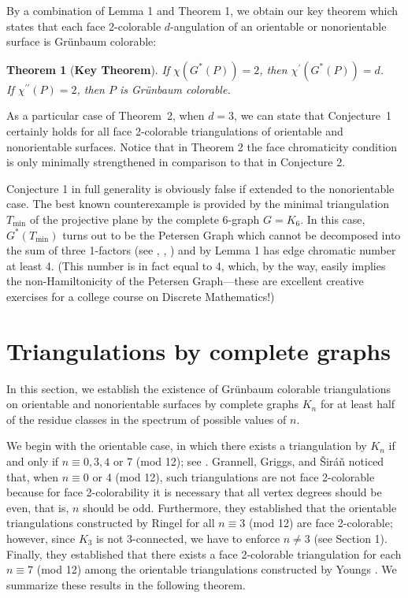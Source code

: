 \documentclass[12pt]{article}
\newtheorem{theorem}{Theorem}
\begin{document}
By a combination of Lemma 1 and Theorem 1, we obtain our key theorem which states that each face 2-colorable $d$-angulation of an orientable or nonorientable surface is Gr\"unbaum colorable: 

\begin{theorem} [\bf Key Theorem]
If $\chi(G^*(P))=2$,  then $\chi^{\prime}(G^*(P))=d$. \\
\indent\indent{} If $\chi^{\prime\prime}(P)=2$,  then $P$  is Gr\"unbaum colorable.
\end{theorem}

As a particular case of Theorem~2, when $d=3$,  we can state that Conjecture~1 certainly holds for all face 2-colorable triangulations of orientable and nonorientable surfaces. 
Notice that in Theorem 2 the face chromaticity condition is only minimally strengthened in comparison to that in Conjecture 2.  

Conjecture 1 in full generality is obviously false if extended to the nonorientable case. The best known counterexample is provided by the minimal triangulation $T_{\min}$  of the projective plane by the complete 6-graph $G=K_6$. In this case, $G^*(T_{\min})$  turns out to be the Petersen Graph \cite{P} which cannot be decomposed into the sum of three 1-factors (see \cite{H}, \cite{LP}, \cite{P}) and by Lemma 1 has edge chromatic number at least 4. (This number is in fact equal to 4, which, by the way, easily implies the non-Hamiltonicity of the Petersen Graph---these are excellent creative exercises for a college course on Discrete Mathematics!)

\section{Triangulations by complete graphs}

In this section, we establish the existence of Gr\"unbaum colorable triangulations on orientable and nonorientable surfaces by complete graphs $K_n$  for at least half of the residue classes in the spectrum of possible values of $n$.
     
We begin with the orientable case, in which there exists a triangulation by $K_n$  if and only if $n\equiv 0, 3, 4$ or 7 (mod 12); see \cite{R}. Grannell, Griggs, and \v{S}ir\'a\v{n} \cite{GGS}  noticed that, when $n\equiv 0$  or 4 (mod 12), such triangulations are not face 2-colorable because for face 2-colorability it is necessary that all vertex degrees should be even, that is, $n$  should be odd. Furthermore, they established that the orientable triangulations constructed by Ringel \cite{R}  for all $n\equiv 3$ (mod 12)  are face 2-colorable; however, since $K_3$ is not 3-connected, we have to enforce $n \ne 3$ (see Section 1).  Finally, they established that there exists a face 2-colorable triangulation for each $n\equiv 7$ (mod 12) among the orientable triangulations constructed by Youngs \cite{Y}. We summarize these results in the following theorem. 
\end{document}
